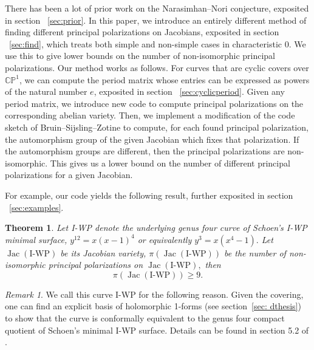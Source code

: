 \documentclass[12pt,reqno]{amsart}
\DeclareMathOperator{\Jac}{Jac}
\newcommand{\C}{\mathbb{C}}
\newcommand{\bb}{\mathbb}
\renewcommand{\P}{\mathbb{P}}
\newtheorem{theorem}{Theorem}
\theoremstyle{definition}
\theoremstyle{remark}
\newtheorem*{remark}{Remark}
\begin{document}
There has been a lot of prior work on the Narasimhan--Nori conjecture, exposited in section ~\ref{sec:prior}. In this paper, we introduce an entirely different method of finding different principal polarizations on Jacobians, exposited in section ~\ref{sec:find}, which treats both simple and non-simple cases in characteristic 0. We use this to give lower bounds on the number of non-isomorphic principal polarizations. Our method works as follows. For curves that are cyclic covers over $\C\bb{P}^1$, we can compute the period matrix whose entries can be expressed as powers of the natural number $e$, exposited in section ~\ref{sec:cyclicperiod}. Given any period matrix, we introduce new code to compute principal polarizations on the corresponding abelian variety. Then, we implement a modification of the code sketch of Bruin--Sijsling--Zotine \cite{numerical} to compute, for each found principal polarization, the automorphism group of the given Jacobian which fixes that polarization. If the automorphism groups are different, then the principal polarizations are non-isomorphic. This gives us a lower bound on the number of different principal polarizations for a given Jacobian. 

For example, our code yields the following result, further exposited in section ~\ref{sec:examples}. 

\begin{theorem} \label{IWP} Let I-WP denote the underlying genus four curve of Schoen's I-WP minimal surface, $y^{12}=x(x-1)^4$ or equivalently $y^3=x(x^4-1).$ Let $\Jac(\text{I-WP})$ be its Jacobian variety, $\pi(\Jac(\text{I-WP}))$ be the number of non-isomorphic principal polarizations on $\Jac(\text{I-WP}),$ then $$\pi(\Jac(\text{I-WP})) \geq 9.$$\end{theorem}

\begin{remark} We call this curve I-WP for the following reason. Given the covering, one can find an explicit basis of holomorphic 1-forms (see section~\ref{sec: dthesis}) to show that the curve is conformally equivalent to the genus four compact quotient of Schoen's minimal I-WP surface. Details can be found in section 5.2 of \cite{dthesis}.
\end{remark}
\end{document}
